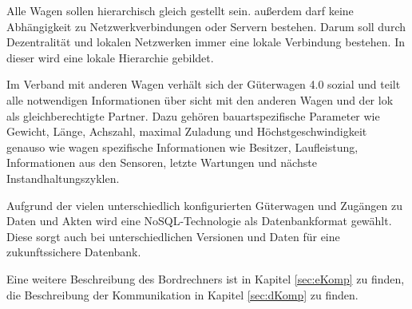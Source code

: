 Alle Wagen sollen hierarchisch gleich gestellt sein. außerdem darf keine Abhängigkeit zu Netzwerkverbindungen oder Servern bestehen. Darum soll durch Dezentralität und lokalen Netzwerken immer eine lokale Verbindung bestehen. In dieser wird eine lokale Hierarchie gebildet.\par
Im Verband mit anderen Wagen verhält sich der Güterwagen 4.0 sozial und teilt alle notwendigen Informationen über sicht mit den anderen Wagen und der lok als gleichberechtigte Partner. Dazu gehören bauartspezifische Parameter wie Gewicht, Länge, Achszahl, maximal Zuladung und Höchstgeschwindigkeit genauso wie wagen spezifische Informationen wie Besitzer, Laufleistung, Informationen aus den Sensoren, letzte Wartungen und nächste Instandhaltungszyklen.\par
Aufgrund der vielen unterschiedlich konfigurierten Güterwagen und Zugängen zu Daten und Akten wird eine NoSQL-Technologie als Datenbankformat gewählt. Diese sorgt auch bei unterschiedlichen Versionen und Daten für eine zukunftssichere Datenbank.\par
Eine weitere Beschreibung des Bordrechners ist in Kapitel \ref{sec:eKomp} zu finden, die Beschreibung der Kommunikation in Kapitel \ref{sec:dKomp} zu finden.



